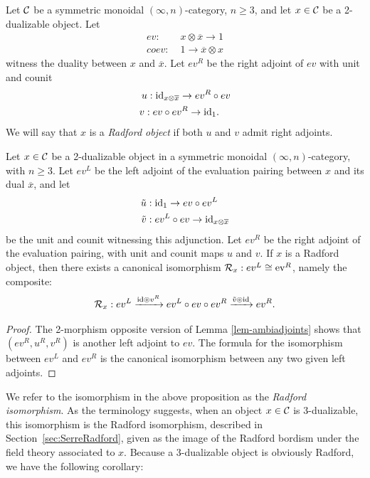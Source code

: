 \documentclass{amsart}
\begin{document}
\begin{definition} \label{def:Radford-Object}
	Let $\mathcal C$ be a symmetric monoidal $(\infty,n)$-category, $n \geq 3$, and let $x \in \mathcal C$ be a 2-dualizable object. Let
	\begin{align*}
		ev: & \; x \otimes \overline{x} \to 1 \\
		coev: & \;  1 \to  \overline{x} \otimes x
	\end{align*}
	 witness the duality between $x$ and $\overline{x}$. Let $ev^R$ be the right adjoint of $ev$ with unit and counit
	\begin{align*}
		u: & \;  \mathrm{id}_{x \otimes \overline{x}} \to ev^R \circ ev \\
		v: \; & ev \circ ev^R \to \mathrm{id}_1. 
	\end{align*}
	We will say that $x$ is a {\em Radford object} if both $u$ and $v$ admit right adjoints. 
\end{definition} 

\begin{proposition} \label{prop-Cat_Radford}
	Let $x \in \mathcal C$ be a 2-dualizable object in a symmetric monoidal $(\infty,n)$-category, with $n \geq 3$. Let $ev^L$ be the left adjoint of the evaluation pairing between $x$ and its dual $\overline{x}$, and let
	\begin{align*}
		\tilde{u}: & \;  \mathrm{id}_1 \to ev \circ ev^L \\
		\tilde{v}: & \; ev^L \circ ev \to \mathrm{id}_{x \otimes \overline{x}}
	\end{align*} 
	be the unit and counit witnessing this adjunction.  Let $ev^R$ be the right adjoint of the evaluation pairing, with unit and counit maps $u$ and $v$.  If $x$ is a Radford object, then there exists a canonical isomorphism $\mathcal R_x: ev^L \cong \mathrm{ev}^R$, namely the composite:
	\begin{equation*}
		\mathcal R_x: ev^L \xrightarrow{\mathrm{id} \circledcirc v^R} ev^L \circ ev \circ ev^R \xrightarrow{\tilde{v} \circledcirc \mathrm{id}} ev^R.
	\end{equation*}
\end{proposition}

\begin{proof}
The 2-morphism opposite version of Lemma \ref{lem-ambiadjoints} shows that $(ev^R, u^R, v^R)$ is another left adjoint to $ev$. The formula for the isomorphism between $ev^L$ and $ev^R$ is the canonical isomorphism between any two given left adjoints. 
\end{proof}

We refer to the isomorphism in the above proposition as the {\em Radford isomorphism}.  As the terminology suggests, when an object $x \in \mathcal C$ is 3-dualizable, this isomorphism is the Radford isomorphism, described in Section~\ref{sec:SerreRadford}, given as the image of the Radford bordism under the field theory associated to $x$.  Because a 3-dualizable object is obviously Radford, we have the following corollary:
\end{document}
